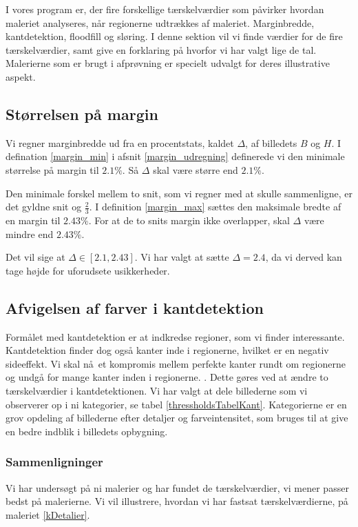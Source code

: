{\sffamily
I vores program er, der fire forskellige tærskelværdier som påvirker
hvordan maleriet analyseres, når regionerne udtrækkes af maleriet.
Marginbredde, kantdetektion, floodfill og sløring. I denne sektion vil
vi finde værdier for de fire tærskelværdier, samt give en forklaring på hvorfor vi
har valgt lige de tal. Malerierne som er brugt i afprøvning er specielt
udvalgt for deres illustrative aspekt. 
}

\subsection{Størrelsen på margin}
Vi regner marginbredde ud fra en procentstats, kaldet $\Delta$, af
billedets $B$ og $H$. I defination \ref{margin_min} i afsnit \ref{margin_udregning} definerede vi den
minimale størrelse på margin til $2.1 \%$. Så $\Delta$ skal være større end $2.1 \%$. 

Den minimale forskel mellem to snit, som vi regner med at skulle sammenligne, er
det gyldne snit og $\frac{2}{3}$. I definition \ref{margin_max} sættes den
maksimale bredte af en margin til $2.43\%$. For at de to snits margin ikke
overlapper, skal $\Delta$ være mindre end $2.43\%$. 

Det vil sige at $\Delta \in [2.1, 2.43]$. Vi har valgt at
sætte $\Delta = 2.4$, da vi derved kan tage højde for uforudsete
usikkerheder.

\subsection{Afvigelsen af farver i kantdetektion}
Formålet med kantdetektion er at indkredse regioner, som vi finder
interessante. Kantdetektion finder dog også kanter inde i regionerne,
hvilket er en negativ sideeffekt. Vi skal nå et kompromis mellem 
perfekte kanter rundt om regionerne og undgå for mange kanter inden i regionerne.
. Dette gøres ved at ændre to tærskelværdier
i kantdetektionen. Vi har valgt at dele billederne som vi observerer op
i ni kategorier, se tabel \ref{thressholdsTabelKant}. Kategorierne er en
grov opdeling af billederne efter detaljer og farveintensitet, som
bruges til at give en bedre indblik i billedets opbygning.

\subsubsection{Sammenligninger}
Vi har undersøgt på ni malerier og har fundet de tærskelværdier, vi mener
passer bedst på malerierne. Vi vil illustrere, hvordan vi har fastsat
tærskelværdierne, på maleriet \ref{kDetalier}.

